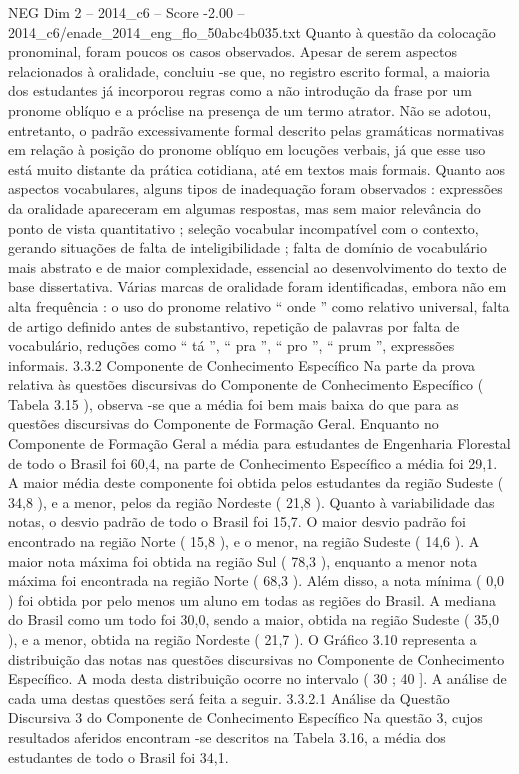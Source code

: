 \begin{textsample}{NEG Dim 2 – 2014\_c6 – Score -2.00 – 2014\_c6/enade\_2014\_eng\_flo\_50abc4b035.txt}
Quanto à questão da colocação pronominal, foram poucos os casos observados.
Apesar de serem aspectos relacionados à oralidade, concluiu -se que, no registro escrito formal, a maioria dos estudantes já incorporou regras como a não introdução da frase por um pronome oblíquo e a próclise na presença de um termo atrator.
Não se adotou, entretanto, o padrão excessivamente formal descrito pelas gramáticas normativas em relação à posição do pronome oblíquo em locuções verbais, já que esse uso está muito distante da prática cotidiana, até em textos mais formais.
Quanto aos aspectos vocabulares, alguns tipos de inadequação foram observados : expressões da oralidade apareceram em algumas respostas, mas sem maior relevância do ponto de vista quantitativo ; seleção vocabular incompatível com o contexto, gerando situações de falta de inteligibilidade ; falta de domínio de vocabulário mais abstrato e de maior complexidade, essencial ao desenvolvimento do texto de base dissertativa.
Várias marcas de oralidade foram identificadas, embora não em alta frequência : o uso do pronome relativo “ onde ” como relativo universal, falta de artigo definido antes de substantivo, repetição de palavras por falta de vocabulário, reduções como “ tá ”, “ pra ”, “ pro ”, “ prum ”, expressões informais. 3.3.2 Componente de Conhecimento Específico Na parte da prova relativa às questões discursivas do Componente de Conhecimento Específico ( Tabela 3.15 ), observa -se que a média foi bem mais baixa do que para as questões discursivas do Componente de Formação Geral.
Enquanto no Componente de Formação Geral a média para estudantes de Engenharia Florestal de todo o Brasil foi 60,4, na parte de Conhecimento Específico a média foi 29,1.
A maior média deste componente foi obtida pelos estudantes da região Sudeste ( 34,8 ), e a menor, pelos da região Nordeste ( 21,8 ).
Quanto à variabilidade das notas, o desvio padrão de todo o Brasil foi 15,7.
O maior desvio padrão foi encontrado na região Norte ( 15,8 ), e o menor, na região Sudeste ( 14,6 ).
A maior nota máxima foi obtida na região Sul ( 78,3 ), enquanto a menor nota máxima foi encontrada na região Norte ( 68,3 ).
Além disso, a nota mínima ( 0,0 ) foi obtida por pelo menos um aluno em todas as regiões do Brasil.
A mediana do Brasil como um todo foi 30,0, sendo a maior, obtida na região Sudeste ( 35,0 ), e a menor, obtida na região Nordeste ( 21,7 ).
O Gráfico 3.10 representa a distribuição das notas nas questões discursivas no Componente de Conhecimento Específico.
A moda desta distribuição ocorre no intervalo ( 30 ; 40 ].
A análise de cada uma destas questões será feita a seguir. 3.3.2.1 Análise da Questão Discursiva 3 do Componente de Conhecimento Específico Na questão 3, cujos resultados aferidos encontram -se descritos na Tabela 3.16, a média dos estudantes de todo o Brasil foi 34,1.

\end{textsample}

